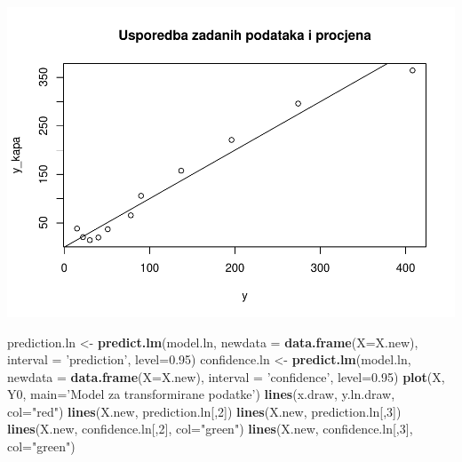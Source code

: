 \documentclass[]{article}
\newenvironment{Shaded}{\begin{snugshade}}{\end{snugshade}}
\newcommand{\KeywordTok}[1]{\textcolor[rgb]{0.13,0.29,0.53}{\textbf{{#1}}}}
\newcommand{\DataTypeTok}[1]{\textcolor[rgb]{0.13,0.29,0.53}{{#1}}}
\newcommand{\DecValTok}[1]{\textcolor[rgb]{0.00,0.00,0.81}{{#1}}}
\newcommand{\FloatTok}[1]{\textcolor[rgb]{0.00,0.00,0.81}{{#1}}}
\newcommand{\StringTok}[1]{\textcolor[rgb]{0.31,0.60,0.02}{{#1}}}
\newcommand{\NormalTok}[1]{{#1}}
\begin{document}
\includegraphics{Izvjestaj_files/figure-latex/unnamed-chunk-15-1.pdf}

\begin{Shaded}
\begin{Highlighting}[]
\NormalTok{prediction.ln <-}\StringTok{ }\KeywordTok{predict.lm}\NormalTok{(model.ln, }\DataTypeTok{newdata =} \KeywordTok{data.frame}\NormalTok{(}\DataTypeTok{X=}\NormalTok{X.new),}
                            \DataTypeTok{interval =} \StringTok{'prediction'}\NormalTok{, }\DataTypeTok{level=}\FloatTok{0.95}\NormalTok{)}
\NormalTok{confidence.ln <-}\StringTok{ }\KeywordTok{predict.lm}\NormalTok{(model.ln, }\DataTypeTok{newdata =} \KeywordTok{data.frame}\NormalTok{(}\DataTypeTok{X=}\NormalTok{X.new),}
                            \DataTypeTok{interval =} \StringTok{'confidence'}\NormalTok{, }\DataTypeTok{level=}\FloatTok{0.95}\NormalTok{)}
\KeywordTok{plot}\NormalTok{(X, Y0, }\DataTypeTok{main=}\StringTok{'Model za transformirane podatke'}\NormalTok{)}
\KeywordTok{lines}\NormalTok{(x.draw, y.ln.draw, }\DataTypeTok{col=}\StringTok{"red"}\NormalTok{)}
\KeywordTok{lines}\NormalTok{(X.new, prediction.ln[,}\DecValTok{2}\NormalTok{])}
\KeywordTok{lines}\NormalTok{(X.new, prediction.ln[,}\DecValTok{3}\NormalTok{])}
\KeywordTok{lines}\NormalTok{(X.new, confidence.ln[,}\DecValTok{2}\NormalTok{], }\DataTypeTok{col=}\StringTok{"green"}\NormalTok{)}
\KeywordTok{lines}\NormalTok{(X.new, confidence.ln[,}\DecValTok{3}\NormalTok{], }\DataTypeTok{col=}\StringTok{"green"}\NormalTok{)}
\end{Highlighting}
\end{Shaded}
\end{document}
